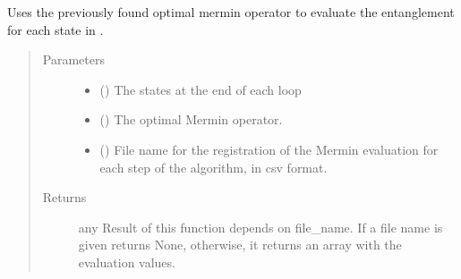 \documentclass[letterpaper,10pt,english]{sphinxmanual}
\begin{document}
\begin{fulllineitems}
\label{\detokenize{grover:grover.grover_evaluate}}
Uses the previously found optimal mermin operator to evaluate the entanglement 
for each state in .
\begin{quote}\begin{description}
\item[{Parameters}] \leavevmode\begin{itemize}
\item {} 
 (\sphinxstyleliteralemphasis{\sphinxupquote{{[}}}\sphinxstyleliteralemphasis{\sphinxupquote{{]}}}) \textendash{} The states at the end of each loop

\item {} 
 () \textendash{} The optimal Mermin operator.

\item {} 
 () \textendash{} File name for the registration of the Mermin evaluation 
for each step of the algorithm, in csv format.

\end{itemize}

\item[{Returns}] \leavevmode
any \textendash{} Result of this function depends on file\_name. If a file name
is given  returns None, otherwise, it returns an array with the 
evaluation values.

\end{description}\end{quote}

\end{fulllineitems}

\end{document}
